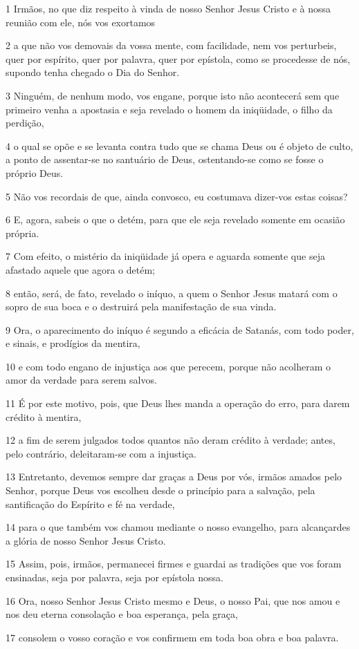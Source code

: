 \par 1 Irmãos, no que diz respeito à vinda de nosso Senhor Jesus Cristo e à nossa reunião com ele, nós vos exortamos
\par 2 a que não vos demovais da vossa mente, com facilidade, nem vos perturbeis, quer por espírito, quer por palavra, quer por epístola, como se procedesse de nós, supondo tenha chegado o Dia do Senhor.
\par 3 Ninguém, de nenhum modo, vos engane, porque isto não acontecerá sem que primeiro venha a apostasia e seja revelado o homem da iniqüidade, o filho da perdição,
\par 4 o qual se opõe e se levanta contra tudo que se chama Deus ou é objeto de culto, a ponto de assentar-se no santuário de Deus, ostentando-se como se fosse o próprio Deus.
\par 5 Não vos recordais de que, ainda convosco, eu costumava dizer-vos estas coisas?
\par 6 E, agora, sabeis o que o detém, para que ele seja revelado somente em ocasião própria.
\par 7 Com efeito, o mistério da iniqüidade já opera e aguarda somente que seja afastado aquele que agora o detém;
\par 8 então, será, de fato, revelado o iníquo, a quem o Senhor Jesus matará com o sopro de sua boca e o destruirá pela manifestação de sua vinda.
\par 9 Ora, o aparecimento do iníquo é segundo a eficácia de Satanás, com todo poder, e sinais, e prodígios da mentira,
\par 10 e com todo engano de injustiça aos que perecem, porque não acolheram o amor da verdade para serem salvos.
\par 11 É por este motivo, pois, que Deus lhes manda a operação do erro, para darem crédito à mentira,
\par 12 a fim de serem julgados todos quantos não deram crédito à verdade; antes, pelo contrário, deleitaram-se com a injustiça.
\par 13 Entretanto, devemos sempre dar graças a Deus por vós, irmãos amados pelo Senhor, porque Deus vos escolheu desde o princípio para a salvação, pela santificação do Espírito e fé na verdade,
\par 14 para o que também vos chamou mediante o nosso evangelho, para alcançardes a glória de nosso Senhor Jesus Cristo.
\par 15 Assim, pois, irmãos, permanecei firmes e guardai as tradições que vos foram ensinadas, seja por palavra, seja por epístola nossa.
\par 16 Ora, nosso Senhor Jesus Cristo mesmo e Deus, o nosso Pai, que nos amou e nos deu eterna consolação e boa esperança, pela graça,
\par 17 consolem o vosso coração e vos confirmem em toda boa obra e boa palavra.


